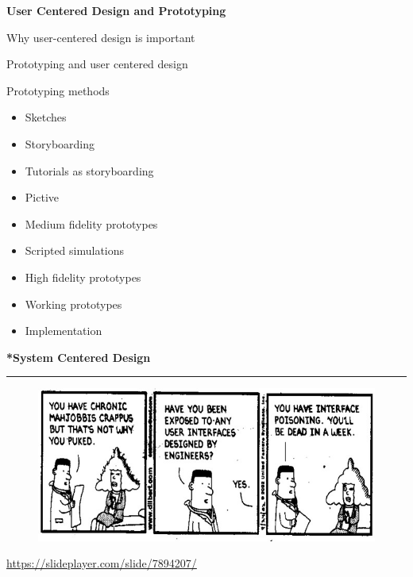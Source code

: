\documentclass[pdf]{beamer}
\begin{document}
\begin{frame}
\begin{center}
    \textbf{\LARGE User Centered Design and Prototyping \LARGE}
\end{center}

\bigskip
\bigskip
\bigskip

Why user-centered design is important

Prototyping and user centered design

Prototyping methods

\begin{itemize}
\item
Sketches
\item
Storyboarding
\item
Tutorials as storyboarding
\item
Pictive
\item
Medium fidelity prototypes
\item
Scripted simulations
\item
High fidelity prototypes
\item
Working prototypes
\item
Implementation
\end{itemize}
\end{frame}



\begin{frame}
\vspace{8mm}
\textcolor{myBlue}{\textbf{\Large{*System Centered Design}}}

\textcolor{red}{\rule{10cm}{1mm}}

\begin{figure}[b]
    \includegraphics[scale = 0.6]{img2.jpg}
\end{figure}

\url{https://slideplayer.com/slide/7894207/}
\end{frame}
\end{document}
